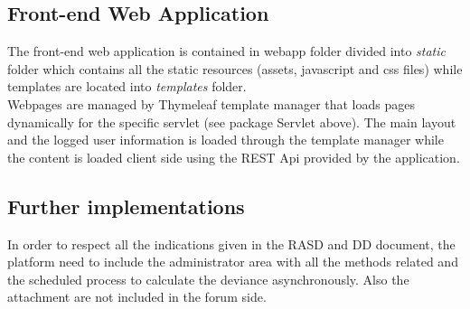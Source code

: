 \subsection{Front-end Web Application}
The front-end web application is contained in webapp folder divided into \textit{static} folder which contains all the static resources (assets, javascript and css files) while templates are located into \textit{templates} folder.\\
Webpages are managed by Thymeleaf template manager that loads pages dynamically for the specific servlet (see package Servlet above).
The main layout and the logged user information is loaded through the template manager while the content is loaded client side using the REST Api provided by the application.

\subsection{Further implementations}

In order to respect all the indications given in the RASD and DD document, the platform need to include the administrator area with all the methods related and the scheduled process to calculate the deviance asynchronously. Also the attachment are not included in the forum side.


